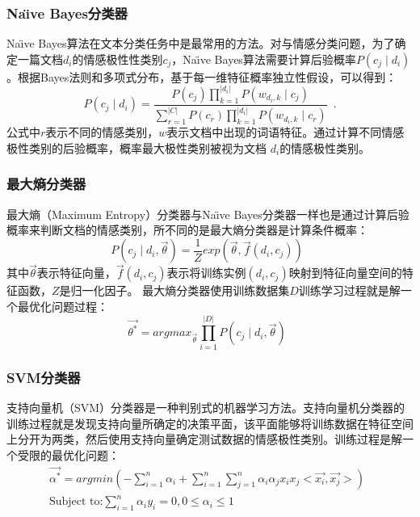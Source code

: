 \subsubsection{Na\"\i ve Bayes分类器}
\label{bayes}
Na\"\i ve Bayes算法在文本分类任务中是最常用的方法。对与情感分类问题，为了确定一篇文档$ d_{i}$的情感极性性类别$ c_{j} $，Na\"\i ve Bayes算法需要计算后验概率$ P \left(c_{j} \mid d_{i} \right)$。根据Bayes法则和多项式分布，基于每一维特征概率独立性假设，可以得到：
\begin{equation}
\label{e4}
P \left(c_{j} \mid d_{i} \right) = \frac{P \left( c_{j} \right)\prod_{k=1}^{| d_{i} |} P \left( w_{d_{i},k} \mid c_{j} \right)}{\sum_{r=1}^{|C|}P \left( c_{r} \right)\prod_{k=1}^{| d_{i} |} P \left( w_{d_{i},k} \mid c_{r} \right)} \enspace .
\end{equation}
公式中$ r $表示不同的情感类别，$ w $表示文档中出现的词语特征。通过计算不同情感极性类别的后验概率，概率最大极性类别被视为文档 $ d_{i} $的情感极性类别。

\subsubsection{最大熵分类器}
\label{entropy}
最大熵（Maximum Entropy）分类器与Na\"\i ve Bayes分类器一样也是通过计算后验概率来判断文档的情感类别，所不同的是最大熵分类器是计算条件概率：
\begin{equation}
\label{e5}
P \left( c_{j} \mid d_{i}, \overrightarrow{\theta} \right) = \frac{1}{Z}exp \left( \overrightarrow{\theta}, \overrightarrow{f} \left( d_{i},c_{j} \right) \right) \enspace
\end{equation}
其中$ \overrightarrow{\theta} $表示特征向量，$ \overrightarrow{f} \left( d_{i}, c_{j} \right)$表示将训练实例$ \left( d_{i}, c_{j} \right) $映射到特征向量空间的特征函数，$ Z $是归一化因子。
最大熵分类器使用训练数据集$ D $训练学习过程就是解一个最优化问题过程：
\begin{equation}
\label{e6}
\overrightarrow{\theta^{\ast}}=argmax_{\overrightarrow{\theta}}\prod_{i=1}^{|D|} P \left( c_{j} \mid d_{i}, \overrightarrow{\theta} \right) \enspace
\end{equation} 

\subsubsection{SVM分类器}
\label{svm}
支持向量机（SVM）分类器是一种判别式的机器学习方法。支持向量机分类器的训练过程就是发现支持向量所确定的决策平面，该平面能够将训练数据在特征空间上分开为两类，然后使用支持向量确定测试数据的情感极性类别。训练过程是解一个受限的最优化问题：
\begin{equation}
\label{e7}
\begin{aligned}
\overrightarrow{\alpha^{\ast}}=argmin \left( -\sum_{i=1}^{n}\alpha_{i} + \sum_{i=1}^{n} \sum_{j=1}^{n}\alpha_{i}\alpha_{j} x_{i}x_{j}<\overrightarrow{x_{i}},\overrightarrow{x_{j}}> \right)\\
\mbox{Subject to:} \sum_{i=1}^{n}\alpha_{i}y_{i}=0 , 0\leqslant \alpha_{i} \leqslant 1
\end{aligned} \enspace
\end{equation}

